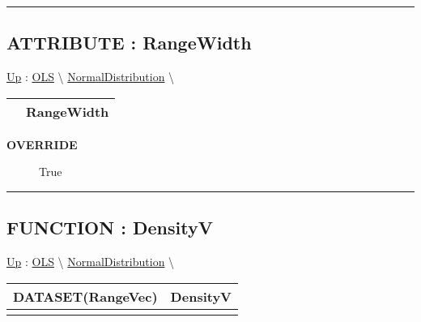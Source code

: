 \rule{\linewidth}{0.5pt}
\subsection*{ATTRIBUTE : RangeWidth}
\hypertarget{ecldoc:linearregression.ols.distributionbase.rangewidth}{}
\hyperlink{ecldoc:linearregression.ols.normaldistribution}{Up} :
\hspace{0pt} \hyperlink{ecldoc:linearregression.ols}{OLS} \textbackslash 
\hspace{0pt} \hyperlink{ecldoc:linearregression.ols.normaldistribution}{NormalDistribution} \textbackslash 

{\renewcommand{\arraystretch}{1.5}
\begin{tabularx}{\textwidth}{|>{\raggedright\arraybackslash}l|X|}
\hline
\hspace{0pt} & RangeWidth \\
\hline
\end{tabularx}
}

\par

\par
\begin{description}
\item [\textbf{OVERRIDE}] True
\end{description}

\rule{\linewidth}{0.5pt}
\subsection*{FUNCTION : DensityV}
\hypertarget{ecldoc:linearregression.ols.distributionbase.densityv}{}
\hyperlink{ecldoc:linearregression.ols.normaldistribution}{Up} :
\hspace{0pt} \hyperlink{ecldoc:linearregression.ols}{OLS} \textbackslash 
\hspace{0pt} \hyperlink{ecldoc:linearregression.ols.normaldistribution}{NormalDistribution} \textbackslash 

{\renewcommand{\arraystretch}{1.5}
\begin{tabularx}{\textwidth}{|>{\raggedright\arraybackslash}l|X|}
\hline
\hspace{0pt}DATASET(RangeVec) & DensityV \\
\hline
\multicolumn{2}{|>{\raggedright\arraybackslash}X|}{\hspace{0pt}()} \\
\hline
\end{tabularx}
}

\par

